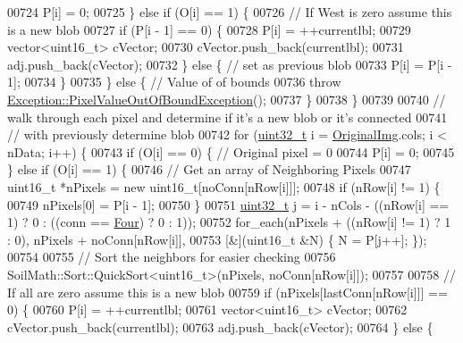 \begin{DoxyCode}
00724       P[i] = 0;
00725     \} \textcolor{keywordflow}{else} \textcolor{keywordflow}{if} (O[i] == 1) \{
00726       \textcolor{comment}{// If West is zero assume this is a new blob}
00727       \textcolor{keywordflow}{if} (P[i - 1] == 0) \{
00728         P[i] = ++currentlbl;
00729         vector<uint16\_t> cVector;
00730         cVector.push\_back(currentlbl);
00731         adj.push\_back(cVector);
00732       \} \textcolor{keywordflow}{else} \{ \textcolor{comment}{// set as previous blob}
00733         P[i] = P[i - 1];
00734       \}
00735     \} \textcolor{keywordflow}{else} \{ \textcolor{comment}{// Value of of bounds}
00736       \textcolor{keywordflow}{throw} \hyperlink{class_vision_1_1_exception_1_1_pixel_value_out_of_bound_exception}{Exception::PixelValueOutOfBoundException}();
00737     \}
00738   \}
00739 
00740   \textcolor{comment}{// walk through each pixel and determine if it's a new blob or it's connected}
00741   \textcolor{comment}{// with previously determine blob}
00742   \textcolor{keywordflow}{for} (\hyperlink{_soil_math_types_8h_a435d1572bf3f880d55459d9805097f62}{uint32\_t} i = \hyperlink{class_vision_1_1_image_processing_a77c370dab270158a4e9c634e2d3f48e7}{OriginalImg}.cols; i < nData; i++) \{
00743     \textcolor{keywordflow}{if} (O[i] == 0) \{ \textcolor{comment}{// Original pixel = 0}
00744       P[i] = 0;
00745     \} \textcolor{keywordflow}{else} \textcolor{keywordflow}{if} (O[i] == 1) \{
00746       \textcolor{comment}{// Get an array of Neighboring Pixels}
00747       uint16\_t *nPixels = \textcolor{keyword}{new} uint16\_t[noConn[nRow[i]]];
00748       \textcolor{keywordflow}{if} (nRow[i] != 1) \{
00749         nPixels[0] = P[i - 1];
00750       \}
00751       \hyperlink{_soil_math_types_8h_a435d1572bf3f880d55459d9805097f62}{uint32\_t} j = i - nCols - ((nRow[i] == 1) ? 0 : ((conn == \hyperlink{class_vision_1_1_segment_a330240c08320e72270fac0aa83d5e27ea1fca5ab1c285c0edd2bdc3072cab0c01}{Four}) ? 0 : 1));
00752       for\_each(nPixels + ((nRow[i] != 1) ? 1 : 0), nPixels + noConn[nRow[i]],
00753                [&](uint16\_t &N) \{ N = P[j++]; \});
00754 
00755       \textcolor{comment}{// Sort the neighbors for easier checking}
00756       SoilMath::Sort::QuickSort<uint16\_t>(nPixels, noConn[nRow[i]]);
00757 
00758       \textcolor{comment}{// If all are zero assume this is a new blob}
00759       \textcolor{keywordflow}{if} (nPixels[lastConn[nRow[i]]] == 0) \{
00760         P[i] = ++currentlbl;
00761         vector<uint16\_t> cVector;
00762         cVector.push\_back(currentlbl);
00763         adj.push\_back(cVector);
00764       \} \textcolor{keywordflow}{else} \{

\end{DoxyCode}
